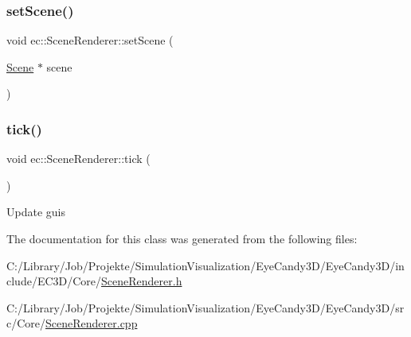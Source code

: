 \subsubsection{\texorpdfstring{set\+Scene()}{setScene()}}
{\footnotesize\ttfamily void ec\+::\+Scene\+Renderer\+::set\+Scene (\begin{DoxyParamCaption}\item[{\mbox{\hyperlink{classec_1_1_scene}{Scene}} $\ast$}]{scene }\end{DoxyParamCaption})}

\mbox{\label{classec_1_1_scene_renderer_a62a39c6b1097757c9757c17506a8b2b0}} 
\subsubsection{\texorpdfstring{tick()}{tick()}}
{\footnotesize\ttfamily void ec\+::\+Scene\+Renderer\+::tick (\begin{DoxyParamCaption}{ }\end{DoxyParamCaption})}

Update guis 

The documentation for this class was generated from the following files\+:\begin{DoxyCompactItemize}
\item 
C\+:/\+Library/\+Job/\+Projekte/\+Simulation\+Visualization/\+Eye\+Candy3\+D/\+Eye\+Candy3\+D/include/\+E\+C3\+D/\+Core/\mbox{\hyperlink{_scene_renderer_8h}{Scene\+Renderer.\+h}}\item 
C\+:/\+Library/\+Job/\+Projekte/\+Simulation\+Visualization/\+Eye\+Candy3\+D/\+Eye\+Candy3\+D/src/\+Core/\mbox{\hyperlink{_scene_renderer_8cpp}{Scene\+Renderer.\+cpp}}\end{DoxyCompactItemize}
